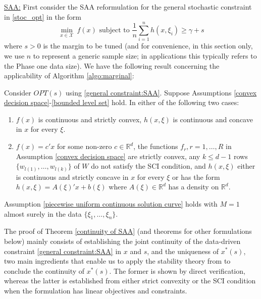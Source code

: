 \documentclass[mnsc,blindrev]{informs4} %
\newcommand{\R}{\mathbb{R}}
\begin{document}
\noindent\underline{SAA:} First consider the SAA reformulation for the general stochastic constraint in \eqref{stoc_opt} in the form
\begin{equation}\label{general constraint:SAA}
\min_{x\in\mathcal X}\ f(x)\text{\ \ subject to\ \ }\frac{1}{n}\sum_{i=1}^nh(x,\xi_i)\geq \gamma +s
\end{equation}
where $s>0$ is the margin to be tuned (and for convenience, in this section only, we use $n$ to represent a generic sample size; in applications this typically refers to the Phase one data size). We have the following result concerning the applicability of Algorithm \ref{algo:marginal}:
\begin{theorem}\label{continuity of SAA}
Consider $OPT(s)$ using \eqref{general constraint:SAA}. Suppose Assumptions \ref{convex decision space}-\ref{bounded level set} hold. In either of the following two cases:
\begin{enumerate}
\item[i.]$f(x)$ is continuous and strictly convex, $h(x,\xi)$ is continuous and concave in $x$ for every $\xi$.
\item[ii.]$f(x)=c'x$ for some non-zero $c\in\R^d$, the functions $f_r,r=1,\ldots,R$ in Assumption \ref{convex decision space} are strictly convex, any $k\leq d-1$ rows $\{w_{l(1)},\ldots,w_{l(k)}\}$ of $W$ do not satisfy the SCI condition, and $h(x,\xi)$ either is continuous and strictly concave in $x$ for every $\xi$ or has the form $h(x,\xi)=A(\xi)'x+b(\xi)$ where $A(\xi)\in\R^d$ has a density on $\R^d$.
\end{enumerate}
Assumption \ref{piecewise uniform continuous solution curve} holds with $M=1$ almost surely in the data $\{\xi_1,\ldots,\xi_n\}$.
\end{theorem}
The proof of Theorem \ref{continuity of SAA} (and theorems for other formulations below) mainly consists of establishing the joint continuity of the data-driven constraint \eqref{general constraint:SAA} in $x$ and $s$, and the uniqueness of $x^*(s)$, two main ingredients that enable us to apply the stability theory from \cite{bonnans2013perturbation} to conclude the continuity of $x^*(s)$. The former is shown by direct verification, whereas the latter is established from either strict convexity or the SCI condition when the formulation has linear objectives and constraints.
\end{document}
